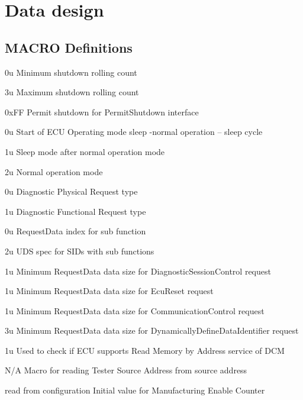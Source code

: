 \section{Data design}

\subsection{MACRO Definitions}
\label{subsec:macro}

{0u}
{Minimum shutdown rolling count}

{3u}
{Maximum shutdown rolling count}

{0xFF}
{Permit shutdown for PermitShutdown interface}

{0u}
{Start of ECU Operating mode sleep -normal operation – sleep cycle}

{1u}
{Sleep mode after normal operation mode}

{2u}
{Normal operation mode}

{0u}
{Diagnostic Physical Request type}

{1u}
{Diagnostic Functional Request type}

{0u}
{RequestData index for sub function}

{2u}
{UDS spec for SIDs with sub functions}

{1u}
{Minimum RequestData data size for DiagnosticSessionControl request}

{1u}
{Minimum RequestData data size for EcuReset request}

{1u}
{Minimum RequestData data size for CommunicationControl request}

{3u}
{Minimum RequestData data size for DynamicallyDefineDataIdentifier request}

{1u}
{Used to check if ECU supports Read Memory by Address service of DCM}

{N/A}
{Macro for reading Tester Source Address from source address}

{read from configuration}
{Initial value for Manufacturing Enable Counter}

